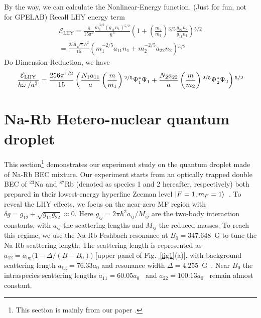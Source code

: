 By the way, we can calculate the Nonlinear-Energy function. (Just for fun, not for GPELAB)
Recall LHY energy term
\begin{equation}
\begin{split}
\mathcal{E}_{\text{LHY}}=\frac{8}{15\pi ^2}\frac{m_1^{3/2}\left(g_{11}n_1\right){}^{5/2}}{\hbar ^3}\left(1+\left(\frac{m_2}{m_1}\right){}^{3/5}\frac{g_{22}n_2}{g_{11}n_1}\right){}^{5/2}\\
=\frac{256\sqrt{\pi }\hbar ^2}{15}\left(m_1^{-2/5}a_{11}n_1+m_2^{-2/5}a_{22}n_2\right){}^{5/2}
\end{split}
\end{equation}
Do Dimension-Reduction, we have
\begin{equation}
\frac{\mathcal{E}_{\text{LHY}}}{\hbar\omega\left/a^3\right.}=\frac{256\pi^{1/2}}{15}\left(\frac{N_1a_{11}}{a}\left(\frac{m}{m_1}\right){}^{2/5}\Psi_1^*\Psi_1+\frac{N_2a_{22}}{a}\left(\frac{m}{m_2}\right){}^{2/5}\Psi _2^*\Psi _2\right){}^{5/2}
\end{equation}

\section{Na-Rb Hetero-nuclear quantum droplet}
\label{sec:droplet_experiment}

This section\footnote{This section is mainly from our paper \cite{guo2021leehuangyang}.} demonstrates our experiment study on the quantum droplet made of Na-Rb BEC mixture. Our experiment starts from an optically trapped double BEC of $^{23}$Na and $^{87}$Rb (denoted as species 1 and 2 hereafter, respectively) both prepared in their lowest-energy hyperfine Zeeman level $\ket{F = 1, m_F = 1}$~\cite{wang2015double}. To reveal the LHY effects, we focus on the near-zero MF region with $\delta g = g_{12} + \sqrt{g_{11} g_{22}} \approx 0$. Here $g_{ij} = 2\pi\hbar^2 a_{ij}/M_{ij}$ are the two-body interaction constants, with $a_{ij}$ the scattering lengths and $M_{ij}$ the reduced masses. To reach this regime, we use the Na-Rb Feshbach resonance at $B_0 = 347.648$~G to tune the Na-Rb scattering length. The scattering length is represented as $a_{12} = a_\text{bg}\big(1-\Delta/(B-B_0)\big)$ [upper panel of Fig.~\ref{fig1}(a)], with background scattering length $a_\text{bg} = 76.33a_0$ and resonance width $\Delta = 4.255$~G~\cite{wang2013observation}. Near $B_0$ the intraspecies scattering lengths $a_{11} = 60.05a_0$~\cite{Knoop2011} and $a_{22} = 100.13a_0$~\cite{Kempen2002} remain almost constant. 

